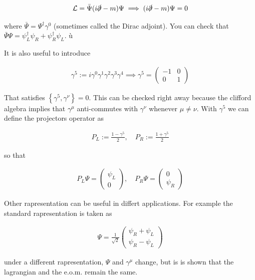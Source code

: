 \documentclass{report}
\begin{document}
\begin{align}
    \mathcal{L} = \bar{\Psi}(i\slashed{\partial} - m)\Psi \implies (i\slashed{\partial} -m)\Psi = 0
\end{align}

where \(\bar{\Psi} = \Psi^\dagger\gamma^0\) (sometimes called the Dirac adjoint). You can check that \(\bar{\Psi}\Psi = \psi_L^\dagger\psi_R + \psi_R^\dagger\psi_L\). ù


It is also useful to introduce 

\begin{align}
    \gamma^5 := i\gamma^0\gamma^1\gamma^2\gamma^3\gamma^4 \implies \gamma^5 = \begin{pmatrix}
        -1 & 0 \\
        0 & 1 
    \end{pmatrix}
\end{align}

That satisfies \(\left\{\gamma^5, \gamma^\nu \right\} = 0\). This can be checked right away because the clifford algebra implies that \(\gamma^\mu\) anti-commutes with \(\gamma^\nu\) whenever \(\mu \neq \nu\). With \(\gamma^5\) we can define the projectors operator as 

\begin{align}
    P_L := \frac{1-\gamma^5}{2}, \quad P_R := \frac{1+\gamma^5}{2}
\end{align}

so that 

\begin{align}
    P_L\Psi = \begin{pmatrix}
        \psi_L \\
        0
    \end{pmatrix}, \quad P_R\Psi = \begin{pmatrix}
        0 \\
        \psi_R
    \end{pmatrix}
\end{align}

Other rapresentation can be useful in differt applications. For example the standard rapresentation is taken as 

\begin{align}
    \Psi = \frac{1}{\sqrt{2}}\begin{pmatrix}
        \psi_R + \psi_L \\
        \psi_R - \psi_L 
    \end{pmatrix}
\end{align}

under a different rapresentation, \(\Psi\) and \(\gamma^\mu\) change, but is is shown that the lagrangian and the e.o.m. remain the same. 
\end{document}
